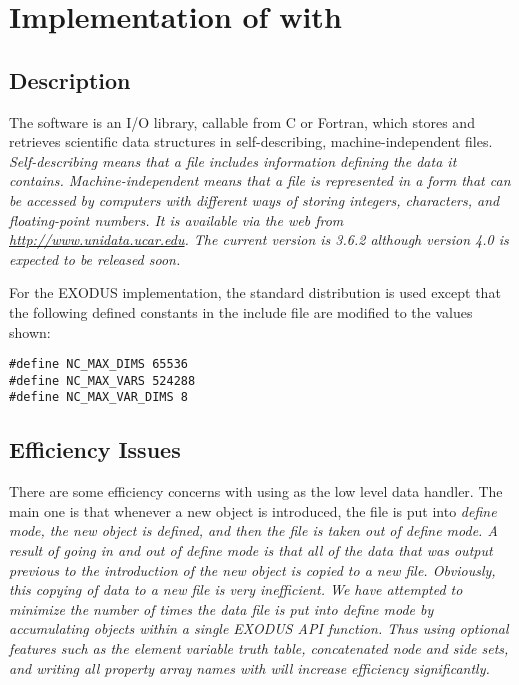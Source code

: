 \chapter{Implementation of \exo{} with }\label{app:efficiency}

\section{Description}

The  software is an I/O library, callable from C or
Fortran, which stores and retrieves scientific data structures in
self-describing, machine-independent files. \em{Self-describing} means
that a file includes information defining the data it
contains. \em{Machine-independent} means that a file is represented in
a form that can be accessed by computers with different ways of
storing integers, characters, and floating-point numbers. It is
available via the web from \url{http://www.unidata.ucar.edu}.  The
current version is 3.6.2 although version 4.0 is expected to be
released soon.

For the EXODUS implementation, the standard 
distribution is used except that the following defined constants in
the include file  are modified to the values shown:

\begin{lstlisting}
#define NC_MAX_DIMS 65536
#define NC_MAX_VARS 524288
#define NC_MAX_VAR_DIMS 8
\end{lstlisting}

\section{Efficiency Issues}

There are some efficiency concerns with using  as the low level
data handler. The main one is that whenever a new object is
introduced, the file is put into \em{define} mode, the new object is
defined, and then the file is taken out of \em{define} mode. A result
of going in and out of \em{define} mode is that all of the data that
was output previous to the introduction of the new object is copied to
a new file. Obviously, this copying of data to a new file is very
inefficient. We have attempted to minimize the number of times the
data file is put into \em{define} mode by accumulating objects within
a single EXODUS API function. Thus using optional features such as
the element variable truth table, concatenated node and side sets, and
writing all property array names with  will
increase efficiency significantly.
